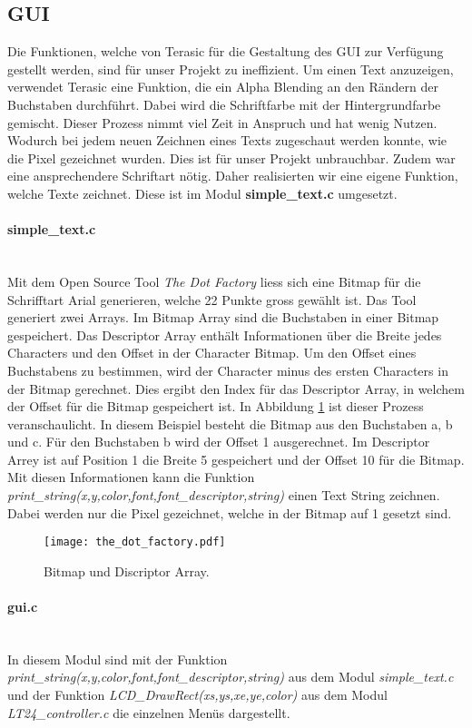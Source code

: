 \subsection{GUI}\label{subsec:gui}
Die Funktionen, welche von Terasic für die Gestaltung des GUI zur Verfügung gestellt werden, sind für unser Projekt zu ineffizient. Um einen Text anzuzeigen, verwendet Terasic eine Funktion, die ein Alpha Blending an den Rändern der Buchstaben durchführt. Dabei wird die Schriftfarbe mit der Hintergrundfarbe gemischt. Dieser Prozess nimmt viel Zeit in Anspruch und hat wenig Nutzen. Wodurch bei jedem neuen Zeichnen eines Texts zugeschaut werden konnte, wie die Pixel gezeichnet wurden. Dies ist für unser Projekt unbrauchbar. Zudem war eine ansprechendere Schriftart nötig. Daher realisierten wir eine eigene Funktion, welche Texte zeichnet. Diese ist im Modul \textbf{simple\_text.c} umgesetzt.

\paragraph{simple\_text.c}\mbox{}\\

Mit dem Open Source Tool \textit{The Dot Factory} liess sich eine Bitmap für die Schrifftart Arial generieren, welche 22 Punkte gross gewählt ist. Das Tool generiert zwei Arrays. Im Bitmap Array sind die Buchstaben in einer Bitmap gespeichert. Das Descriptor Array enthält Informationen über die Breite jedes Characters und den Offset in der Character Bitmap. Um den Offset eines Buchstabens zu bestimmen, wird der Character minus des ersten Characters in der Bitmap gerechnet. Dies ergibt den Index für das Descriptor Array, in welchem der Offset für die Bitmap gespeichert ist. In Abbildung \ref{img:bitmap} ist dieser Prozess veranschaulicht. In diesem Beispiel besteht die Bitmap aus den Buchstaben a, b und c. Für den Buchstaben b wird der Offset 1 ausgerechnet. Im Descriptor Arrey ist auf Position 1 die Breite 5 gespeichert und der Offset 10 für die Bitmap. Mit diesen Informationen kann die Funktion \textit{print\_string(x,y,color,font,font\_descriptor,string)} einen Text String zeichnen. Dabei werden nur die Pixel gezeichnet, welche in der Bitmap auf 1 gesetzt sind.

\begin{figure}[h]
	\centering
	\texttt{[image: the\_dot\_factory.pdf]}
	\caption{Bitmap und Discriptor Array.}
	\label{img:bitmap}
\end{figure}

\paragraph{gui.c} \mbox{}\\

In diesem Modul sind mit der Funktion \textit{print\_string(x,y,color,font,font\_descriptor,string)} aus dem Modul  \textit{simple\_text.c} und der Funktion \textit{LCD\_DrawRect(xs,ys,xe,ye,color)} aus dem Modul \textit{LT24\_controller.c} die einzelnen Menüs dargestellt. 